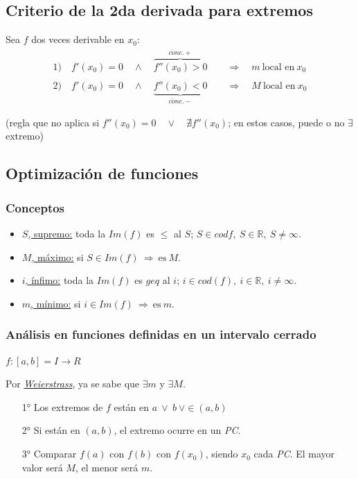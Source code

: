 \documentclass[11pt,titlepage]{article}
\begin{document}
\subsection{Criterio de la 2da derivada para extremos}
Sea $f$ dos veces derivable en $x_0$:
\begin{gather*}
	1) \quad f'(x_0) = 0 \quad \land \quad \overbrace{f''(x_0) > 0}^{c\acute{o}nc. +} \qquad \Rightarrow \quad m %
	\ \text{local en} \ x_0 \\ \\
	2) \quad f'(x_0) = 0 \quad \land \quad \underbrace{f''(x_0) < 0}_{c\acute{o}nc. -} \qquad \Rightarrow \quad M %
	\ \text{local en} \ x_0
\end{gather*}
\begin{center}
	\footnotesize{(regla que no aplica si $f''(x_0) = 0 \quad \lor \quad \nexists f''(x_0)$; en estos casos, %
	puede o no $\exists$ extremo)}
\end{center}

\subsection{Optimización de funciones}
\subsubsection{Conceptos}
\begin{itemize}
	\item \underline{$S$, supremo:} toda la $Im(f)$ es $\leq$ al $S$; $S \in cod{f}, \ S \in \mathbb{R}, \ S \neq \infty$.
	\item \underline{$M$, máximo:} si $S \in Im(f) \ \Rightarrow \ \text{es} \ M$.
	\item \underline{$i$, ínfimo:} toda la $Im(f)$ es $geq$ al $i$; $i \in cod(f), \ i \in \mathbb{R}, \ i \neq \infty$.
	\item \underline{$m$, mínimo:} si $i \in Im(f) \ \Rightarrow \ \text{es} \ m$.
\end{itemize}

\subsubsection{Análisis en funciones definidas en un intervalo cerrado}
\begin{center}
	$f: [a,b] = I \to R$
\end{center} \par
Por \hyperref[tw]{\emph{Weierstrass}}, ya se sabe que $\exists m$ y $\exists M$.
\begin{itemize}
	\item[1°] Los extremos de $f$ están en $a \ \lor \ b \ \lor \in (a,b)$
	\item[2°] Si están en $(a,b)$, el extremo ocurre en un \emph{PC}.
	\item[3°] Comparar $f(a)$ con $f(b)$ con $f(x_0)$, siendo $x_0$ cada \emph{PC}. El mayor valor será $M$, %
	el menor será $m$.
\end{itemize}
\end{document}
